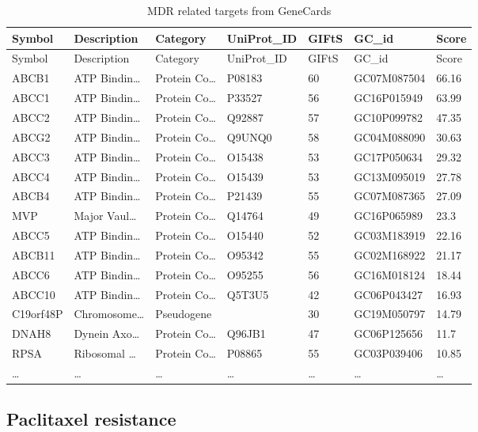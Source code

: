 \documentclass[
]{article}
\begin{document}
\begin{longtable}[]{@{}lllllll@{}}
\caption{\label{tab:MDR-related-targets-from-GeneCards}MDR related targets from GeneCards}\tabularnewline
\toprule
Symbol & Description & Category & UniProt\_ID & GIFtS & GC\_id & Score\tabularnewline
\midrule
\endfirsthead
\toprule
Symbol & Description & Category & UniProt\_ID & GIFtS & GC\_id & Score\tabularnewline
\midrule
\endhead
ABCB1 & ATP Bindin\ldots{} & Protein Co\ldots{} & P08183 & 60 & GC07M087504 & 66.16\tabularnewline
ABCC1 & ATP Bindin\ldots{} & Protein Co\ldots{} & P33527 & 56 & GC16P015949 & 63.99\tabularnewline
ABCC2 & ATP Bindin\ldots{} & Protein Co\ldots{} & Q92887 & 57 & GC10P099782 & 47.35\tabularnewline
ABCG2 & ATP Bindin\ldots{} & Protein Co\ldots{} & Q9UNQ0 & 58 & GC04M088090 & 30.63\tabularnewline
ABCC3 & ATP Bindin\ldots{} & Protein Co\ldots{} & O15438 & 53 & GC17P050634 & 29.32\tabularnewline
ABCC4 & ATP Bindin\ldots{} & Protein Co\ldots{} & O15439 & 53 & GC13M095019 & 27.78\tabularnewline
ABCB4 & ATP Bindin\ldots{} & Protein Co\ldots{} & P21439 & 55 & GC07M087365 & 27.09\tabularnewline
MVP & Major Vaul\ldots{} & Protein Co\ldots{} & Q14764 & 49 & GC16P065989 & 23.3\tabularnewline
ABCC5 & ATP Bindin\ldots{} & Protein Co\ldots{} & O15440 & 52 & GC03M183919 & 22.16\tabularnewline
ABCB11 & ATP Bindin\ldots{} & Protein Co\ldots{} & O95342 & 55 & GC02M168922 & 21.17\tabularnewline
ABCC6 & ATP Bindin\ldots{} & Protein Co\ldots{} & O95255 & 56 & GC16M018124 & 18.44\tabularnewline
ABCC10 & ATP Bindin\ldots{} & Protein Co\ldots{} & Q5T3U5 & 42 & GC06P043427 & 16.93\tabularnewline
C19orf48P & Chromosome\ldots{} & Pseudogene & & 30 & GC19M050797 & 14.79\tabularnewline
DNAH8 & Dynein Axo\ldots{} & Protein Co\ldots{} & Q96JB1 & 47 & GC06P125656 & 11.7\tabularnewline
RPSA & Ribosomal \ldots{} & Protein Co\ldots{} & P08865 & 55 & GC03P039406 & 10.85\tabularnewline
\ldots{} & \ldots{} & \ldots{} & \ldots{} & \ldots{} & \ldots{} & \ldots{}\tabularnewline
\bottomrule
\end{longtable}

\begin{center}\vspace{1.5cm}\end{center}

\hypertarget{paclitaxel-resistance}{%
\subsection{Paclitaxel resistance}\label{paclitaxel-resistance}}
\end{document}
